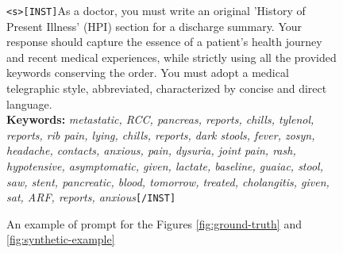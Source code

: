\begin{figure}[h]
\centering
\begin{tcolorbox}[colback=blue!5!white,colframe=blue!75!black]
\verb|<s>[INST]|As a doctor, you must write an original 'History of Present Illness' (HPI) section for a discharge summary.
Your response should capture the essence of a patient's health journey and recent medical experiences, while strictly using all the provided keywords conserving the order.
You must adopt a medical telegraphic style, abbreviated, characterized by concise and direct language.
\\
\textbf{Keywords:} \textit{metastatic, RCC, pancreas, reports, chills, tylenol, reports, rib pain, lying, chills, reports, dark stools, fever, zosyn, headache, contacts, anxious, pain, dysuria, joint pain, rash, hypotensive, asymptomatic, given, lactate, baseline, guaiac, stool, saw, stent, pancreatic, blood, tomorrow, treated, cholangitis, given, sat, ARF, reports, anxious}\verb|[/INST]|
\end{tcolorbox}
\caption{An example of prompt for the Figures \ref{fig:ground-truth} and \ref{fig:synthetic-example}}
\label{experiment:prompt}
\end{figure}

